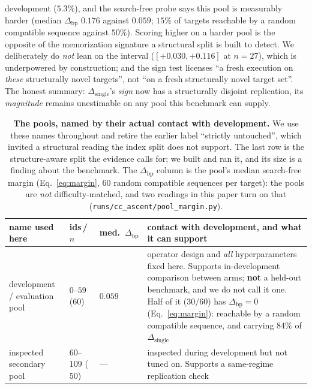 \documentclass[11pt]{article}
\begin{document}
development ($5.3\%$), and the search-free probe says this pool is measurably harder (median
$\Delta_{\mathrm{bp}}$ $0.176$ against $0.059$; $15\%$ of targets reachable by a random compatible sequence
against $50\%$). Scoring higher on a harder pool is the opposite of the memorization signature a structural
split is built to detect. We deliberately do \emph{not} lean on the interval ($[{+}0.030,{+}0.116]$ at
$n{=}27$), which is underpowered by construction; and the sign test licenses ``a fresh execution on
\emph{these} structurally novel targets'', not ``on a fresh structurally novel target set''. The honest
summary: $\Delta_{\mathrm{single}}$'s \emph{sign} now has a structurally disjoint replication, its
\emph{magnitude} remains unestimable on any pool this benchmark can supply.

\begin{table}[t]\centering\small
\setlength{\tabcolsep}{4.5pt}\renewcommand{\arraystretch}{1.15}
\caption{\textbf{The pools, named by their actual contact with development.} We use these names throughout and
retire the earlier label ``strictly untouched'', which invited a structural reading the index split does not
support. The last row is the structure-aware split the evidence calls for; we built and ran it, and its size is a finding about the benchmark. The $\Delta_{\mathrm{bp}}$ column is the pool's median
search-free margin (Eq.~\eqref{eq:margin}, $60$ random compatible sequences per target): the pools are
\emph{not} difficulty-matched, and two readings in this paper turn on that
(\texttt{runs/cc\_ascent/pool\_margin.py}).}\label{tab:pools}
\begin{tabularx}{\linewidth}{@{}>{\raggedright\arraybackslash}p{2.7cm}>{\raggedright\arraybackslash}p{1.3cm}>{\centering\arraybackslash}p{1.15cm}L@{}}
\toprule
\textbf{name used here} & \textbf{ids\,/\,$n$} & \textbf{med.\ $\Delta_{\mathrm{bp}}$} &
\textbf{contact with development, and what it can support}\\
\midrule
development / evaluation pool & $0$--$59$ ($60$) & $0.059$ & operator design and \emph{all} hyperparameters fixed here.
Supports in-development comparison between arms; \textbf{not} a held-out benchmark, and we do not call it one.
Half of it ($30/60$) has $\Delta_{\mathrm{bp}}{=}0$ (Eq.~\eqref{eq:margin}): reachable by a random compatible
sequence, and carrying $84\%$ of $\Delta_{\mathrm{single}}$\\
inspected secondary pool & $60$--$109$ ($50$) & --- & inspected during development but not tuned on. Supports a
same-regime replication check\\

\end{tabularx}
\end{table}
\end{document}
